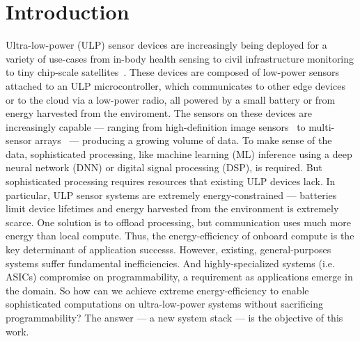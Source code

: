 \chapter{Introduction}
\label{chapter:intro}
Ultra-low-power (ULP) sensor devices are increasingly being deployed for a variety of use-cases from in-body health sensing to civil infrastructure monitoring to tiny chip-scale satellites~\cite{kicksat}.
% 
% 
These devices are composed of low-power sensors attached to an ULP microcontroller, which communicates to other edge devices or to the cloud via a low-power radio, all powered by a small battery or from energy harvested from the enviroment.
% 
The sensors on these devices are increasingly capable --- ranging from high-definition image sensors~\cite{naderiparizi2018towards} to multi-sensor arrays~\cite{laput2017synthetic} --- producing a growing volume of data.
% 
To make sense of the data, sophisticated processing, like machine learning (ML) inference using a deep neural network (DNN) or digital signal processing (DSP), is required.
% 
But sophisticated processing requires resources that existing ULP devices lack.
% 
In particular, ULP sensor systems are extremely energy-constrained --- batteries limit device lifetimes and energy harvested from the environment is extremely scarce.
% 
% 
One solution is to offload processing, but communication uses much more energy than local compute.
% 
Thus, the energy-efficiency of onboard compute is the key determinant of application successs.
% 
However, existing, general-purposes systems suffer fundamental inefficiencies.
% 
And highly-specialized systems (i.e. ASICs) compromise on programmability, a requirement as applications emerge in the domain. 
% 
So how can we achieve extreme energy-efficiency to enable sophisticated computations on ultra-low-power systems without sacrificing programmability?
% 
% 
%
% 
The answer --- a new system stack --- is the objective of this work.

